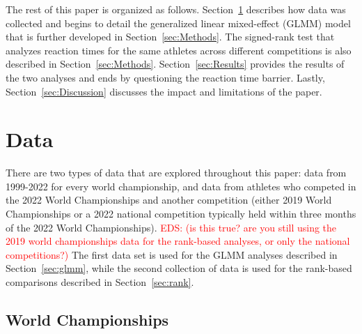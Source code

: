 \documentclass[12pt, letterpaper, titlepage]{article}
\newcommand{\eds}[1]{\textcolor{red}{EDS: (#1)}}
\begin{document}
The rest of this paper is organized as follows. Section~\ref{sec:Data} describes 
how data was collected and begins to detail the generalized linear mixed-effect 
(GLMM) model that is further developed in Section~\ref{sec:Methods}. The 
signed-rank test that analyzes reaction times for the same athletes across
different competitions is
also described in Section~\ref{sec:Methods}.  Section~\ref{sec:Results}
 provides the results of the two analyses and ends 
by questioning the reaction time barrier.  Lastly, Section~\ref{sec:Discussion}
discusses the impact and limitations of the paper.


\section{Data} \label{sec:Data}

There are two types of data that are explored throughout this paper: data from
1999-2022 for every world championship, and data from athletes who competed in
the 2022 World Championships and another competition (either 2019 World 
Championships or a 2022 national competition typically held within three months 
of the 2022 World Championships). 
\eds{is this true? are you still using the 2019 world championships data for the
rank-based analyses, or only the national competitions?}
The first data set is used for the GLMM analyses described in 
Section~\ref{sec:glmm}, while the second collection of data is used for the 
rank-based comparisons described in Section~\ref{sec:rank}.

\subsection{World Championships}\label{sec:dataworld}
\end{document}
